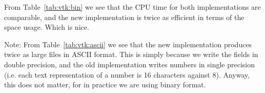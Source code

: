 \documentclass[12pt]{article}
\newcommand{\vect}[1]{\boldsymbol{\mathbf{#1}}}
\begin{document}
From Table~\ref{tab:vtk:bin} we see that the CPU time for both implementations are comparable, and the new implementation is twice as efficient in terms of the space usage. Which is nice.

Note: From Table~\ref{tab:vtk:ascii} we see that the new implementation produces twice as large files in ASCII format. This is simply because we write the fields in double precision, and the old implementation writes numbers in single precision (i.e. each text representation of a number is 16 characters against 8). Anyway, this does not matter, for in practice we are using binary format.

%
%
\end{document}
